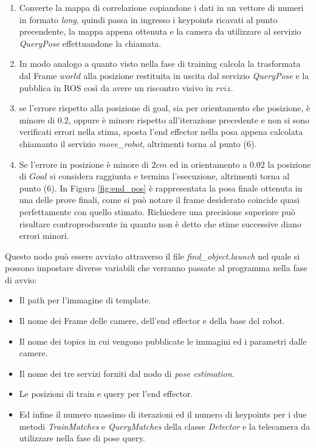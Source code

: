 \documentclass[english]{article}
\begin{document}
\begin{enumerate}
\item Converte la mappa di correlazione copiandone i dati in un vettore di numeri in formato \textit{long}, quindi passa in ingresso i keypoints ricavati al punto precendente, la mappa appena ottenuta e la camera da utilizzare al servizio \textit{QueryPose} effettuandone la chiamata.
\item In modo analogo a quanto visto nella fase di training calcola la trasformata dal Frame $world$ alla posizione restituita in uscita dal servizio \textit{QueryPose} e la pubblica in ROS così da avere un riscontro visivo in $rviz$.
\item se l'errore rispetto alla posizione di goal, sia per orientamento che posizione, è minore di $0.2$, oppure è minore rispetto all'iterazione precedente e non si sono verificati errori nella stima, sposta l'end effector nella posa appena calcolata chiamanto il servizio \textit{move\_robot}, altrimenti torna al punto (6).
\item Se l'errore in posizione è minore di $2cm$ ed in orientamento a $0.02$ la posizione di $Goal$ si considera raggiunta e termina l'esecuzione, altrimenti torna al punto (6). In Figura \ref{fig:end_pos} è rappresentata la posa finale ottenuta in una delle prove finali, come si può notare il frame desiderato coincide quasi perfettamente con quello stimato. Richiedere una precisione superiore può risultare controproducente in quanto non è detto che stime successive diano errori minori.
\end{enumerate}
Questo nodo può essere avviato attraverso il file \textit{find\_object.launch} nel quale si possono impostare diverse variabili che verranno passate al programma nella fase di avvio:
\begin{itemize}
\item Il path per l'immagine di template.
\item Il nome dei Frame delle camere, dell'end effector e della base del robot.
\item Il nome dei topics in cui vengono pubblicate le immagini ed i parametri dalle camere.
\item Il nome dei tre servizi forniti dal nodo di \textit{pose estimation}.
\item Le posizioni di train e query per l'end effector.
\item Ed infine il numero massimo di iterazioni ed il numero di keypoints per i due metodi \textit{TrainMatches} e \textit{QueryMatches} della classe \textit{Detector} e la telecamera da utilizzare nella fase di pose query.
\end{itemize}
\end{document}
